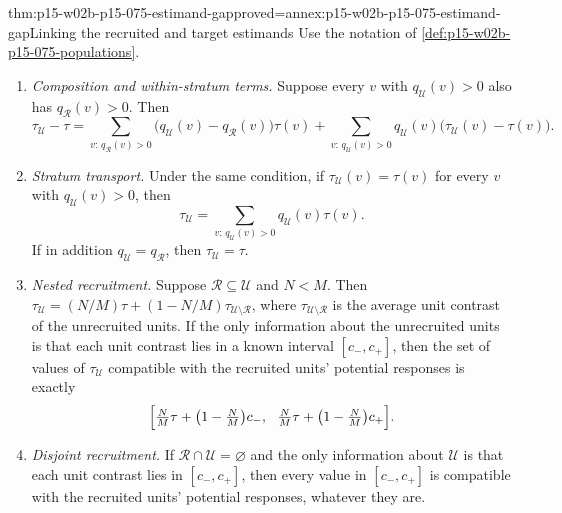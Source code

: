 \begin{hbtheorem}{thm:p15-w02b-p15-075-estimand-gap}{proved=annex:p15-w02b-p15-075-estimand-gap}{Linking the recruited and target estimands}
Use the notation of \cref{def:p15-w02b-p15-075-populations}.
\begin{enumerate}
\item \emph{Composition and within-stratum terms.} Suppose every
\(v\) with \(q_{\mathcal U}(v)>0\) also has \(q_{\mathcal R}(v)>0\). Then
\[
 \tau_{\mathcal U}-\tau
 =\sum_{v:\,q_{\mathcal R}(v)>0}\bigl(q_{\mathcal U}(v)-q_{\mathcal R}(v)\bigr)\tau(v)
 +\sum_{v:\,q_{\mathcal U}(v)>0}q_{\mathcal U}(v)\bigl(\tau_{\mathcal U}(v)-\tau(v)\bigr).
\]
\item \emph{Stratum transport.} Under the same condition, if
\(\tau_{\mathcal U}(v)=\tau(v)\) for every \(v\) with \(q_{\mathcal U}(v)>0\),
then
\[
 \tau_{\mathcal U}=\sum_{v:\,q_{\mathcal U}(v)>0}q_{\mathcal U}(v)\tau(v).
\]
If in addition \(q_{\mathcal U}=q_{\mathcal R}\), then
\(\tau_{\mathcal U}=\tau\).
\item \emph{Nested recruitment.} Suppose \(\mathcal R\subseteq\mathcal U\)
and \(N<M\). Then
\(\tau_{\mathcal U}=(N/M)\tau+(1-N/M)\tau_{\mathcal U\setminus\mathcal R}\),
where \(\tau_{\mathcal U\setminus\mathcal R}\) is the average unit contrast of
the unrecruited units. If the only information about the unrecruited units is
that each unit contrast lies in a known interval \([c_-,c_+]\), then the set
of values of \(\tau_{\mathcal U}\) compatible with the recruited units'
potential responses is exactly
\[
 \Bigl[\tfrac NM\tau+\bigl(1-\tfrac NM\bigr)c_-,\ \
       \tfrac NM\tau+\bigl(1-\tfrac NM\bigr)c_+\Bigr].
\]
\item \emph{Disjoint recruitment.} If \(\mathcal R\cap\mathcal U=\varnothing\)
and the only information about \(\mathcal U\) is that each unit contrast lies in
\([c_-,c_+]\), then every value in \([c_-,c_+]\) is compatible with the
recruited units' potential responses, whatever they are.
\end{enumerate}
\end{hbtheorem}

